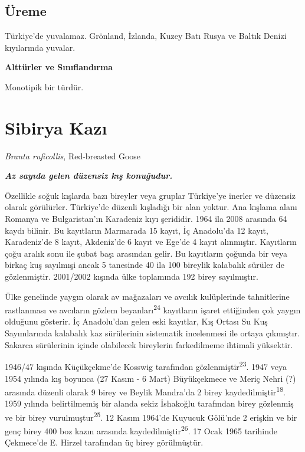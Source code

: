 \documentclass[
  letterpaper,
  DIV=11,
  numbers=noendperiod]{scrreprt}
\begin{document}
\hypertarget{uxfcreme-5}{%
\subsection{\texorpdfstring{\textbf{Üreme}}{Üreme}}\label{uxfcreme-5}}

Türkiye'de yuvalamaz. Grönland, İzlanda, Kuzey Batı Rusya ve Baltık
Denizi kıyılarında yuvalar.

\textbf{Alttürler ve Sınıflandırma}

Monotipik bir türdür.

\hypertarget{sibirya-kazux131}{%
\section{Sibirya Kazı}\label{sibirya-kazux131}}

\emph{Branta ruficollis}, Red-breasted Goose

\textbf{\emph{Az sayıda gelen düzensiz kış konuğudur.}}

Özellikle soğuk kışlarda bazı bireyler veya gruplar Türkiye'ye inerler
ve düzensiz olarak görülürler. Türkiye'de düzenli kışladığı bir alan
yoktur. Ana kışlama alanı Romanya ve Bulgaristan'ın Karadeniz kıyı
şerididir. 1964 ila 2008 arasında 64 kaydı bilinir. Bu kayıtların
Marmarada 15 kayıt, İç Anadolu'da 12 kayıt, Karadeniz'de 8 kayıt,
Akdeniz'de 6 kayıt ve Ege'de 4 kayıt alınmıştır. Kayıtların çoğu aralık
sonu ile şubat başı arasından gelir. Bu kayıtların çoğunda bir veya
birkaç kuş sayılmışi ancak 5 tanesinde 40 ila 100 bireylik kalabalık
sürüler de gözlenmiştir. 2001/2002 kışında ülke toplamında 192 birey
sayılmıştır.

Ülke genelinde yaygın olarak av mağazaları ve avcılık kulüplerinde
tahnitlerine rastlanması ve avcıların gözlem
beyanları\textsuperscript{24} kayıtların işaret ettiğinden çok yaygın
olduğunu gösterir. İç Anadolu'dan gelen eski kayıtlar, Kış Ortası Su Kuş
Sayımlarında kalabalık kaz sürülerinin sistematik incelenmesi ile ortaya
çıkmıştır. Sakarca sürülerinin içinde olabilecek bireylerin farkedilmeme
ihtimali yüksektir.

1946/47 kışında Küçükçekme'de Kosswig tarafından
gözlenmiştir\textsuperscript{23}. 1947 veya 1954 yılında kış boyunca (27
Kasım - 6 Mart) Büyükçekmece ve Meriç Nehri (?) arasında düzenli olarak
9 birey ve Beylik Mandra'da 2 birey kaydedilmiştir\textsuperscript{18}.
1959 yılında belirtilmemiş bir alanda sekiz İshakoğlu tarafından birey
gözlenmiş ve bir birey vurulmuştur\textsuperscript{25}. 12 Kasım 1964'de
Kuyucuk Gölü'nde 2 erişkin ve bir genç birey 400 boz kazın arasında
kaydedilmiştir\textsuperscript{26}. 17 Ocak 1965 tarihinde Çekmece'de E.
Hirzel tarafından üç birey görülmüştür.
\end{document}

